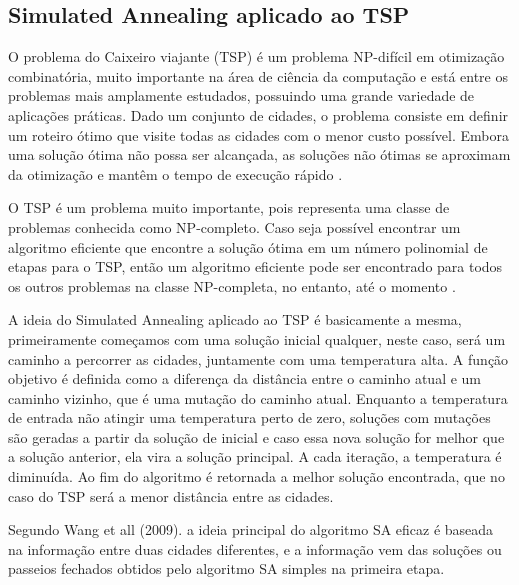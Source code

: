 \documentclass[journal]{IEEEtran}
\begin{document}
\subsection{Simulated Annealing aplicado ao TSP}
O problema do Caixeiro viajante (TSP) é um problema NP-difícil em otimização combinatória, muito importante na área de ciência da computação e  está entre os problemas mais amplamente estudados, possuindo uma grande variedade de aplicações práticas.  Dado um conjunto de cidades, o problema consiste em definir um roteiro ótimo que visite todas as cidades com o menor custo possível. Embora uma solução ótima não possa ser alcançada, as soluções não ótimas se aproximam da otimização e mantêm o tempo de execução rápido \cite{Abdulkarim}.

O TSP é um problema muito importante, pois representa uma classe de problemas conhecida como NP-completo. Caso seja possível encontrar um algoritmo eficiente que encontre a solução ótima em um número polinomial de etapas para o TSP, então um algoritmo eficiente pode ser encontrado para todos os outros problemas na classe NP-completa, no entanto, até o momento \cite{GENG}.

A ideia do Simulated Annealing aplicado ao TSP é basicamente a mesma, primeiramente começamos com  uma solução inicial qualquer, neste caso, será um caminho a percorrer as cidades, juntamente com uma temperatura alta. A função objetivo é definida como a diferença da distância entre o caminho atual e um caminho vizinho, que é uma mutação do caminho atual. Enquanto a temperatura de entrada não atingir uma temperatura perto de zero,  soluções com mutações são geradas a partir da solução de inicial e caso essa nova solução for melhor que a solução anterior, ela vira a solução principal.  A cada  iteração, a temperatura é diminuída. Ao fim do algoritmo é retornada a melhor solução encontrada, que no caso do TSP será a menor distância entre as cidades.

Segundo Wang et all (2009). a ideia principal do algoritmo SA eficaz é baseada na informação entre duas cidades diferentes, e a informação vem das soluções ou passeios fechados obtidos pelo algoritmo SA simples na primeira etapa.
\end{document}
